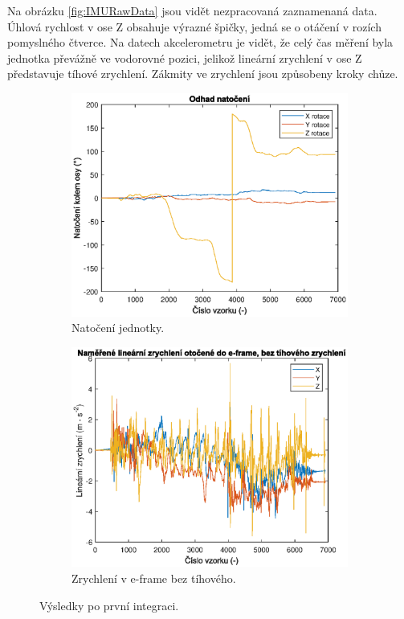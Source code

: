 Na obrázku \ref{fig:IMURawData} jsou vidět nezpracovaná zaznamenaná data. Úhlová rychlost v ose Z obsahuje výrazné špičky, jedná se o otáčení v rozích pomyslného čtverce. Na datech akcelerometru je vidět, že celý čas měření byla jednotka převážně ve vodorovné pozici, jelikož lineární zrychlení v ose Z představuje tíhové zrychlení. Zákmity ve zrychlení jsou způsobeny kroky chůze.

\begin{figure}[h]
     \centering
     \begin{subfigure}[b]{0.49\textwidth}
         \centering
         \includegraphics[width=\textwidth]{obrazky/matlab/1measOrient}
         \caption{Natočení jednotky.}   
         \label{fig:Rotation}  
     \end{subfigure}
     \hfill
     \centering
     \begin{subfigure}[b]{0.49\textwidth}
         \centering
         \includegraphics[width=\textwidth]{obrazky/matlab/1measAccelEframeWithoutG}
         \caption{Zrychlení v e-frame bez tíhového.}   
         \label{fig:AccelWithoutG}  
     \end{subfigure}

        \caption{Výsledky po první integraci.}
        \label{fig:rotationAccel}
\end{figure}


